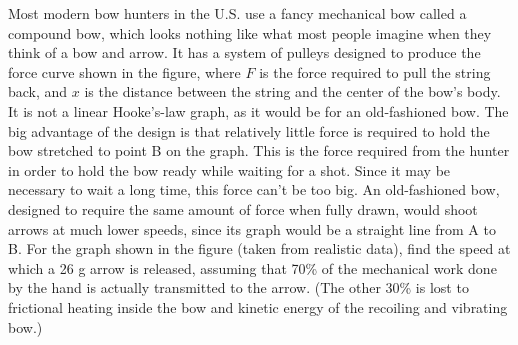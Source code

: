 Most modern bow hunters in the U.S. use a fancy mechanical bow called a
compound bow, which looks nothing like what most people imagine when they
think of a bow and arrow. It has a system of pulleys designed to produce
the force curve shown in the figure, where $F$ is the force required to
pull the string back, and $x$ is the distance between the string and the
center of the bow's body. It is not a linear Hooke's-law graph, as it
would be for an old-fashioned bow. The big advantage of the design is
that relatively little force is required to hold the bow stretched to
point B on the graph. This is the force required from the hunter in order
to hold the bow ready while waiting for a shot. Since it may be necessary
to wait a long time, this force can't be too big. An old-fashioned bow,
designed to require the same amount of force when fully drawn, would
shoot arrows at much lower speeds, since its graph would be a straight line
from A to B. For the graph shown in the figure (taken from realistic
data), find the speed at which a 26 g arrow is released, assuming that
70\% of the mechanical work done by the hand is actually transmitted
to the arrow. (The other 30\% is lost to frictional heating inside the
bow and kinetic energy of the recoiling and vibrating bow.)
\answercheck
